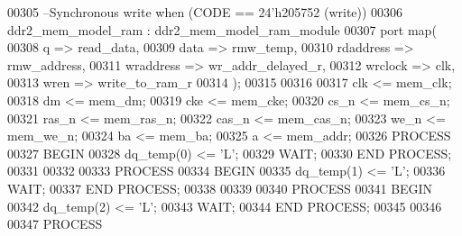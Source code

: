 \begin{DoxyCode}
00305 \textcolor{keyword}{  --Synchronous write when (CODE == 24'h205752 (write))}
00306   ddr2_mem_model_ram : ddr2_mem_model_ram_module
00307     \textcolor{keywordflow}{port} \textcolor{keywordflow}{map}(
00308       q => read_data,
00309       data => rmw_temp,
00310       rdaddress => rmw_address,
00311       wraddress => wr_addr_delayed_r,
00312       wrclock => clk,
00313       wren => write_to_ram_r
00314     \textcolor{vhdlchar}{)};
00315 
00316 
00317   \textcolor{vhdlchar}{clk} \textcolor{vhdlchar}{<=} \textcolor{vhdlchar}{mem_clk};
00318   \textcolor{vhdlchar}{dm} \textcolor{vhdlchar}{<=} \textcolor{vhdlchar}{mem_dm};
00319   \textcolor{vhdlchar}{cke} \textcolor{vhdlchar}{<=} \textcolor{vhdlchar}{mem_cke};
00320   \textcolor{vhdlchar}{cs_n} \textcolor{vhdlchar}{<=} \textcolor{vhdlchar}{mem_cs_n};
00321   \textcolor{vhdlchar}{ras_n} \textcolor{vhdlchar}{<=} \textcolor{vhdlchar}{mem_ras_n};
00322   \textcolor{vhdlchar}{cas_n} \textcolor{vhdlchar}{<=} \textcolor{vhdlchar}{mem_cas_n};
00323   \textcolor{vhdlchar}{we_n} \textcolor{vhdlchar}{<=} \textcolor{vhdlchar}{mem_we_n};
00324   \textcolor{vhdlchar}{ba} \textcolor{vhdlchar}{<=} \textcolor{vhdlchar}{mem_ba};
00325   \textcolor{vhdlchar}{a} \textcolor{vhdlchar}{<=} \textcolor{vhdlchar}{mem_addr};
00326   \textcolor{keywordflow}{PROCESS}
00327   \textcolor{keywordflow}{BEGIN}
00328     \textcolor{vhdlchar}{dq_temp}\textcolor{vhdlchar}{(}\textcolor{vhdllogic}{}\textcolor{vhdllogic}{0}\textcolor{vhdlchar}{)} \textcolor{vhdlchar}{<=} \textcolor{vhdlchar}{'}\textcolor{vhdlchar}{L}\textcolor{vhdlchar}{'};  
00329   \textcolor{keywordflow}{WAIT};
00330   \textcolor{keywordflow}{END} \textcolor{keywordflow}{PROCESS};
00331   
00332   
00333   \textcolor{keywordflow}{PROCESS}
00334   \textcolor{keywordflow}{BEGIN}
00335     \textcolor{vhdlchar}{dq_temp}\textcolor{vhdlchar}{(}\textcolor{vhdllogic}{}\textcolor{vhdllogic}{1}\textcolor{vhdlchar}{)} \textcolor{vhdlchar}{<=} \textcolor{vhdlchar}{'}\textcolor{vhdlchar}{L}\textcolor{vhdlchar}{'};  
00336   \textcolor{keywordflow}{WAIT};
00337   \textcolor{keywordflow}{END} \textcolor{keywordflow}{PROCESS};
00338   
00339   
00340   \textcolor{keywordflow}{PROCESS}
00341   \textcolor{keywordflow}{BEGIN}
00342     \textcolor{vhdlchar}{dq_temp}\textcolor{vhdlchar}{(}\textcolor{vhdllogic}{}\textcolor{vhdllogic}{2}\textcolor{vhdlchar}{)} \textcolor{vhdlchar}{<=} \textcolor{vhdlchar}{'}\textcolor{vhdlchar}{L}\textcolor{vhdlchar}{'};  
00343   \textcolor{keywordflow}{WAIT};
00344   \textcolor{keywordflow}{END} \textcolor{keywordflow}{PROCESS};
00345   
00346   
00347   \textcolor{keywordflow}{PROCESS}

\end{DoxyCode}
